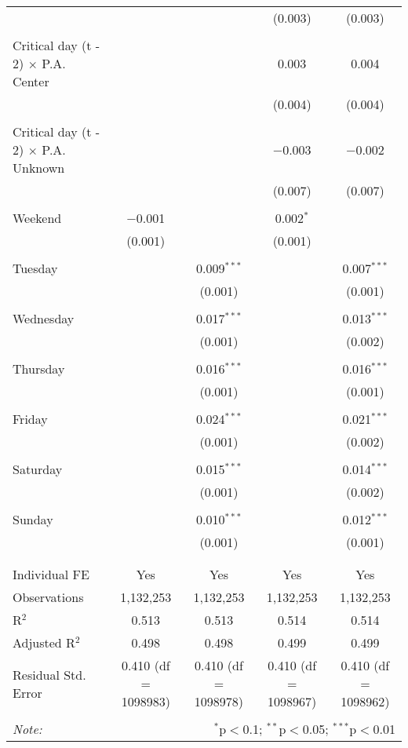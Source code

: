 \documentclass[
]{article}
\begin{document}
\begin{table}[!htbp]
{\begin{tabular}{@{\extracolsep{5pt}}lcccc}
  &  &  & (0.003) & (0.003) \\ 
  & & & & \\ 
 Critical day (t - 2) $\times$ P.A. Center &  &  & 0.003 & 0.004 \\ 
  &  &  & (0.004) & (0.004) \\ 
  & & & & \\ 
 Critical day (t - 2) $\times$ P.A. Unknown &  &  & $-$0.003 & $-$0.002 \\ 
  &  &  & (0.007) & (0.007) \\ 
  & & & & \\ 
 Weekend & $-$0.001 &  & 0.002$^{*}$ &  \\ 
  & (0.001) &  & (0.001) &  \\ 
  & & & & \\ 
 Tuesday &  & 0.009$^{***}$ &  & 0.007$^{***}$ \\ 
  &  & (0.001) &  & (0.001) \\ 
  & & & & \\ 
 Wednesday &  & 0.017$^{***}$ &  & 0.013$^{***}$ \\ 
  &  & (0.001) &  & (0.002) \\ 
  & & & & \\ 
 Thursday &  & 0.016$^{***}$ &  & 0.016$^{***}$ \\ 
  &  & (0.001) &  & (0.001) \\ 
  & & & & \\ 
 Friday &  & 0.024$^{***}$ &  & 0.021$^{***}$ \\ 
  &  & (0.001) &  & (0.002) \\ 
  & & & & \\ 
 Saturday &  & 0.015$^{***}$ &  & 0.014$^{***}$ \\ 
  &  & (0.001) &  & (0.002) \\ 
  & & & & \\ 
 Sunday &  & 0.010$^{***}$ &  & 0.012$^{***}$ \\ 
  &  & (0.001) &  & (0.001) \\ 
  & & & & \\ 
\hline \\[-1.8ex] 
Individual FE & Yes & Yes & Yes & Yes \\ 
Observations & 1,132,253 & 1,132,253 & 1,132,253 & 1,132,253 \\ 
R$^{2}$ & 0.513 & 0.513 & 0.514 & 0.514 \\ 
Adjusted R$^{2}$ & 0.498 & 0.498 & 0.499 & 0.499 \\ 
Residual Std. Error & 0.410 (df = 1098983) & 0.410 (df = 1098978) & 0.410 (df = 1098967) & 0.410 (df = 1098962) \\ 
\hline 
\hline \\[-1.8ex] 
\textit{Note:}  & \multicolumn{4}{r}{$^{*}$p$<$0.1; $^{**}$p$<$0.05; $^{***}$p$<$0.01} \\ 
\end{tabular}
} 
\end{table} 
\newpage
\end{document}
